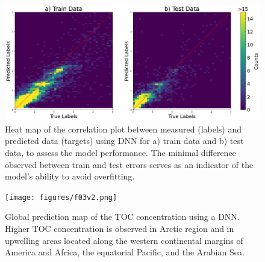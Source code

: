 \documentclass[journal abbreviation, manuscript]{copernicus}
\begin{document}
\begin{figure}
    \centering
    \includegraphics[width = 12 cm]{figures/f02.png}
    \caption{Heat map of the correlation plot between measured (labels) and predicted data (targets) using DNN for a) train data and b) test data, to assess the model performance. The minimal difference observed between train and test errors serves as an indicator of the model's ability to avoid overfitting.}
    \label{fig:correlationPlot}
\end{figure}



\begin{figure}
        \centering
        \texttt{[image: figures/f03v2.png]}
        \caption{Global prediction map of the TOC concentration using a DNN. Higher TOC concentration is observed in Arctic region and in upwelling areas located along the western continental margins of America and Africa, the equatorial Pacific, and the Arabian Sea.}
        \label{fig:tocPercent}
\end{figure}
\end{document}
